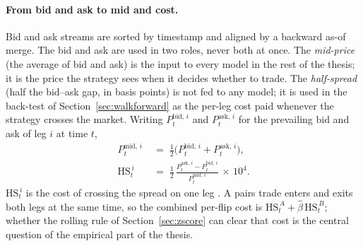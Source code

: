 \paragraph{From bid and ask to mid and cost.}
Bid and ask streams are sorted by timestamp and aligned by a backward as-of merge. The bid and ask are used in two roles, never both at once. The \emph{mid-price} (the average of bid and ask) is the input to every model in the rest of the thesis; it is the price the strategy sees when it decides whether to trade. The \emph{half-spread} (half the bid--ask gap, in basis points) is not fed to any model; it is used in the back-test of Section~\ref{sec:walkforward} as the per-leg cost paid whenever the strategy crosses the market. Writing $P_t^{\mathrm{bid},\,i}$ and $P_t^{\mathrm{ask},\,i}$ for the prevailing bid and ask of leg $i$ at time $t$,
\begin{equation}\label{eq:midprice}
\begin{aligned}
    P_t^{\mathrm{mid},\,i} \;&=\; \tfrac{1}{2}\bigl(P_t^{\mathrm{bid},\,i} + P_t^{\mathrm{ask},\,i}\bigr),\\[3pt]
    \mathrm{HS}_t^{\,i} \;&=\; \tfrac{1}{2}\,\frac{P_t^{\mathrm{ask},\,i} - P_t^{\mathrm{bid},\,i}}{P_t^{\mathrm{mid},\,i}}\,\times\, 10^{4}.
\end{aligned}
\end{equation}
$\mathrm{HS}_t^{\,i}$ is the cost of crossing the spread on one leg \parencite{roll1984spread}. A pairs trade enters and exits both legs at the same time, so the combined per-flip cost is $\mathrm{HS}_t^{\,A} + \hat\beta\,\mathrm{HS}_t^{\,B}$; whether the rolling rule of Section~\ref{sec:zscore} can clear that cost is the central question of the empirical part of the thesis.

